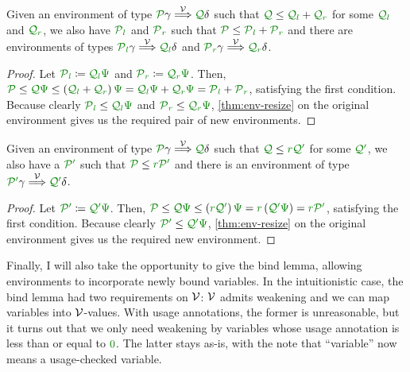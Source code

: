 \begin{lemma}\label{thm:lr-env-add}
  Given an environment of type $\grP\gamma \env\V \grQ\delta$ such that
  $\grQ \leq \grQl + \grQr$ for some $\grQl$ and $\grQr$, we also have $\grPl$
  and $\grPr$ such that $\grP \leq \grPl + \grPr$ and there are environments
  of types $\grPl\gamma \env\V \grQl\delta$ and
  $\grPr\gamma \env\V \grQr\delta$.
\end{lemma}
\begin{proof}
  Let $\grPl \coloneqq \grQl\gr\Psi$ and $\grPr \coloneqq \grQr\gr\Psi$.
  Then, $\grP \leq \grQ\gr\Psi \leq \plr{\grQl + \grQr}\gr\Psi =
  \grQl\gr\Psi + \grQr\gr\Psi = \grPl + \grPr$, satisfying the first condition.
  Because clearly $\grPl \leq \grQl\gr\Psi$ and $\grPr \leq \grQr\gr\Psi$,
  \cref{thm:env-resize} on the original environment gives us the required
  pair of new environments.
\end{proof}

\begin{lemma}\label{thm:lr-env-scale}
  Given an environment of type $\grP\gamma \env\V \grQ\delta$ such that
  $\grQ \leq \gr r\grQprime$ for some $\grQprime$, we also have a $\grPprime$
  such that $\grP \leq \gr r\grPprime$ and there is an environment of type
  $\grPprime\gamma \env\V \grQprime\delta$.
\end{lemma}
\begin{proof}
  Let $\grPprime \coloneqq \grQprime\gr\Psi$.
  Then, $\grP \leq \grQ\gr\Psi \leq \plr{\gr r\grQprime}\gr\Psi =
  \gr r\plr{\grQprime\gr\Psi} = \gr r\grPprime$, satisfying the first condition.
  Because clearly $\grPprime \leq \grQprime\gr\Psi$,
  \cref{thm:env-resize} on the original environment gives us the required
  new environment.
\end{proof}

Finally, I will also take the opportunity to give the bind lemma, allowing
environments to incorporate newly bound variables.
In the intuitionistic case, the bind lemma had two requirements on $\mathcal V$: $\mathcal V$
admits weakening and we can map variables into $\mathcal V$-values.
With usage annotations, the former is unreasonable, but it turns out that we
only need weakening by variables whose usage annotation is less than or equal
to $\gr0$.
The latter stays as-is, with the note that ``variable'' now means a
usage-checked variable.

